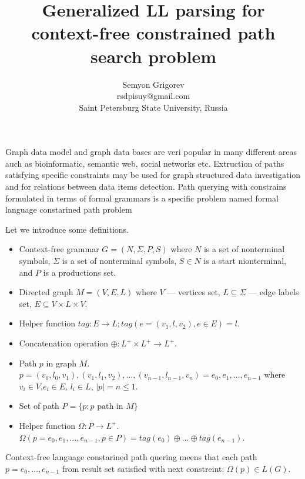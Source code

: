 \documentclass{sig-alternate} %
\begin{document}
\makeatletter
\def\@copyrightspace{\relax}
\makeatother

\title{Generalized LL parsing for context-free constrained path search problem}

\sloppy

\author{Semyon Grigorev\\
rsdpisuy@gmail.com\\
Saint Petersburg State University, Russia}

\maketitle

Graph data model and graph data bases are veri popular in many different areas auch as bioinformatic, semantic web, social networks etc.
Extruction of paths satisfying specific constraints may be used for graph structured data investigation and for relations between data items detection.
Path querying with constrains formulated in terms of formal grammars is a specific problem named formal language constarined path problem~\cite{FLCpathProblem} 
~\cite{DirOfBigGraphAnalysis}

Let we introduce some definitions.
\begin{itemize}
  \item Context-free grammar $G=(N, \Sigma, P, S)$ where $N$ is a set of nonterminal symbols, $\Sigma$ is a set of nonterminal symbols, $S \in N$ is a start nionterminal, and $P$ is a productions set. 
  \item Directed graph $M = (V,E,L)$ where $V$ --- vertices set, $L \subseteq \Sigma$ --- edge labels set, $E\subseteq V\times L\times V$.
  \item Helper function $tag: E \rightarrow L; tag(e = (v_1,l,v_2), e \in E) = l$.
  \item Concatenation operation $\oplus: L^+ \times L^+ \rightarrow L^+$.
  \item Path $p$ in graph $M$. \\ $p = (v_0,l_0,v_1),(v_1,l_1,v_2),\dots,(v_{n-1},l_{n-1},v_n) = e_0,e_1,\dots,e_{n-1}$ where $v_i \in V$,$e_i \in E$, $l_i \in L$, $|p| = n \leq 1$. 
  \item Set of path $P = \{p: p \text{ path in } M\}$
  \item Helper function $\Omega: P \rightarrow L^+$.\\ $\Omega(p = e_0,e_1,\dots,e_{n-1}, p \in P) = tag (e_0) \oplus \dots \oplus tag (e_{n-1})$.
\end{itemize}
Context-free language constarined path quering meens that each path $p = e_0,\dots,e_{n-1}$ from result set satisfied with next constreint: $\Omega(p) \in L(G)$. 
\end{document}
